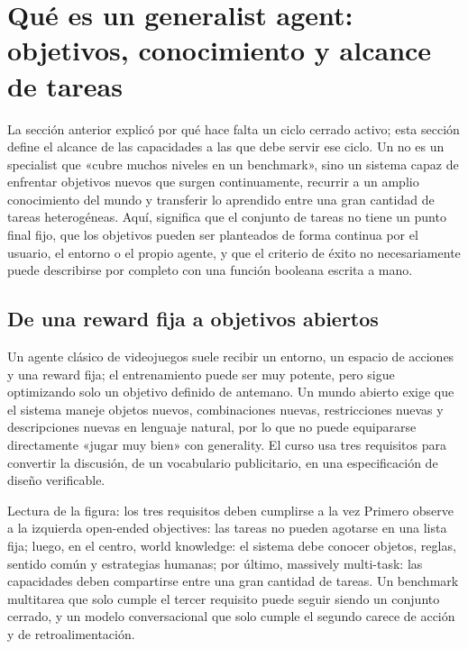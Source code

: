 \section{Qué es un generalist agent: objetivos, conocimiento y alcance de tareas}

La sección anterior explicó por qué hace falta un ciclo cerrado activo; esta sección define el alcance de las capacidades a las que debe servir ese ciclo. Un  no es un specialist que «cubre muchos niveles en un benchmark», sino un sistema capaz de enfrentar objetivos nuevos que surgen continuamente, recurrir a un amplio conocimiento del mundo y transferir lo aprendido entre una gran cantidad de tareas heterogéneas. Aquí,  significa que el conjunto de tareas no tiene un punto final fijo, que los objetivos pueden ser planteados de forma continua por el usuario, el entorno o el propio agente, y que el criterio de éxito no necesariamente puede describirse por completo con una función booleana escrita a mano.

\subsection{De una reward fija a objetivos abiertos}

Un agente clásico de videojuegos suele recibir un entorno, un espacio de acciones y una reward fija; el entrenamiento puede ser muy potente, pero sigue optimizando solo un objetivo definido de antemano. Un mundo abierto exige que el sistema maneje objetos nuevos, combinaciones nuevas, restricciones nuevas y descripciones nuevas en lenguaje natural, por lo que no puede equipararse directamente «jugar muy bien» con generality. El curso usa tres requisitos para convertir la discusión, de un vocabulario publicitario, en una especificación de diseño verificable.


\begin{knowledgebox}{Lectura de la figura: los tres requisitos deben cumplirse a la vez}
Primero observe a la izquierda open-ended objectives: las tareas no pueden agotarse en una lista fija; luego, en el centro, world knowledge: el sistema debe conocer objetos, reglas, sentido común y estrategias humanas; por último, massively multi-task: las capacidades deben compartirse entre una gran cantidad de tareas. Un benchmark multitarea que solo cumple el tercer requisito puede seguir siendo un conjunto cerrado, y un modelo conversacional que solo cumple el segundo carece de acción y de retroalimentación.
\end{knowledgebox}

